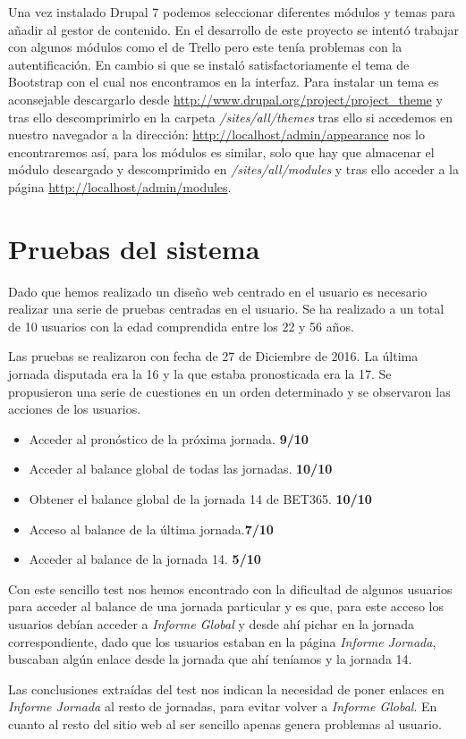 Una vez instalado Drupal 7 podemos seleccionar diferentes módulos y temas para añadir al gestor de contenido. En el desarrollo de este proyecto se intentó trabajar con algunos módulos como el de Trello pero este tenía problemas con la autentificación. En cambio si que se instaló satisfactoriamente el tema de Bootstrap con el cual nos encontramos en la interfaz. Para instalar un tema es aconsejable descargarlo desde \url{http://www.drupal.org/project/project_theme} y tras ello descomprimirlo en la carpeta \textit{/sites/all/themes} tras ello si accedemos en nuestro navegador a la dirección: \url{http://localhost/admin/appearance} nos lo encontraremos así, para los módulos es similar, solo que hay que almacenar el módulo descargado y descomprimido en \textit{/sites/all/modules} y tras ello acceder a la página \url{http://localhost/admin/modules}.

\section{Pruebas del sistema}

Dado que hemos realizado un diseño web centrado en el usuario es necesario realizar una serie de pruebas centradas en el usuario. Se ha realizado a un total de 10 usuarios con la edad comprendida entre los 22 y 56 años.

Las pruebas se realizaron con fecha de 27 de Diciembre de 2016. La última jornada disputada era la 16 y la que estaba pronosticada era la 17. Se propusieron una serie de cuestiones en un orden determinado y se observaron las acciones de los usuarios.

\begin{itemize}
\item Acceder al pronóstico de la próxima jornada. \textbf{9/10}
\item Acceder al balance global de todas las jornadas. \textbf{10/10}
\item Obtener el balance global de la jornada 14 de BET365. \textbf{10/10}
\item Acceso al balance de la última jornada.\textbf{7/10}
\item Acceder al balance de la jornada 14. \textbf{5/10}
\end{itemize}

Con este sencillo test nos hemos encontrado con la dificultad de algunos usuarios para acceder al balance de una jornada particular y es que, para este acceso los usuarios debían acceder a \textit{Informe Global} y desde ahí pichar en la jornada correspondiente, dado que los usuarios estaban en la página \textit{Informe Jornada}, buscaban algún enlace desde la jornada que ahí teníamos y la jornada 14.

Las conclusiones extraídas del test nos indican la necesidad de poner enlaces en \textit{Informe Jornada} al resto de jornadas, para evitar volver a \textit{Informe Global}. En cuanto al resto del sitio web al ser sencillo apenas genera problemas al usuario.

